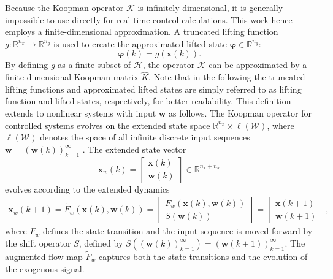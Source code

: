Because the Koopman operator $\mathcal{K}$ is infinitely dimensional, it is generally impossible to use directly for real-time control calculations. This work hence employs a finite-dimensional approximation. A truncated lifting function $g: \mathbb{R}^{n_{x}} \to \mathbb{R}^{n_{g}}$ is used to create the approximated lifted state $\bm{\varphi} \in \mathbb{R}^{n_{g}}$:
\begin{equation}
    \bm{\varphi}(k) = g(\bm{x}(k)). \label{eq:observ}
\end{equation}
By defining $g$ as a finite subset of $\mathcal{H}$, the operator $\mathcal{K}$ can be approximated by a finite-dimensional Koopman matrix $\hat{K}$. Note that in the following the truncated lifting functions and approximated lifted states are simply referred to as lifting function and lifted states, respectively, for better readability.
%
This definition extends to nonlinear systems with input $\bm{w}$ as follows. The Koopman operator for controlled systems evolves on the extended state space $\mathbb{R}^{n_{x}} \times \ell(\mathcal{W})$, where $\ell(\mathcal{W})$ denotes the space of all infinite discrete input sequences $\bm{w} = (\bm{w}(k))_{k=1}^\infty$ \cite{arbabi2018data, korda2018linear}. The extended state vector 
\[
\bm{x}_w(k) = \begin{bmatrix} \bm{x}(k) \\ \bm{w}(k) \end{bmatrix} \in \mathbb{R}^{n_x + n_w}
\]
evolves according to the extended dynamics
\begin{align} \label{eq:KoopStateForced}
    \bm{x}_w(k+1) = \tilde{F}_w(\bm{x}(k), \bm{w}(k)) = \begin{bmatrix} F_w(\bm{x}(k), \bm{w}(k)) \\ S(\bm{w}(k)) \end{bmatrix} = \begin{bmatrix} \bm{x}(k+1) \\ \bm{w}(k+1) \end{bmatrix},
\end{align}
where $F_w$ defines the state transition and the input sequence is moved forward by the shift operator $S$, defined by $S\left( (\bm{w}(k))_{k=1}^\infty \right) = (\bm{w}(k+1))_{k=1}^\infty$. The augmented flow map $\tilde{F}_w$ captures both the state transitions and the evolution of the exogenous signal.

